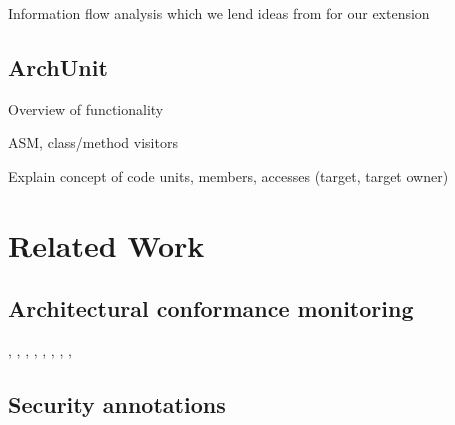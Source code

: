 Information flow analysis \cite{hutchison_information_2005} which we lend ideas from for our extension

\subsection{ArchUnit}\label{archunit-back-section}

Overview of functionality

ASM, class/method visitors

Explain concept of code units, members, accesses (target, target owner)

\section{Related Work}

\subsection{Architectural conformance monitoring}
\cite{aldrich_archjava_2002}, \cite{abi-antoun_analyzing_2010}, \cite{luckham_event-based_1995}, \cite{abi-antoun_static_2009}, \cite{de_silva_controlling_2012}, \cite{knodel_comparison_2007}, \cite{jansen_documenting_2008}, \cite{hong_yan_discotect_2004}, 

\subsection{Security annotations}




